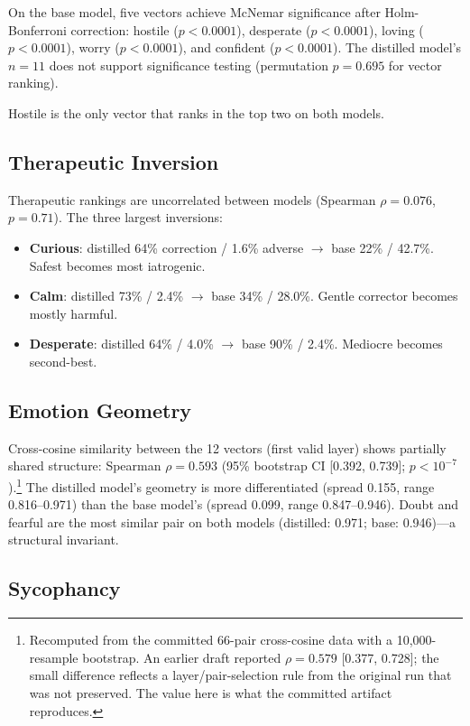 \documentclass[11pt,a4paper]{article}
\begin{document}
On the base model, five vectors achieve McNemar significance after
Holm-Bonferroni correction: hostile ($p < 0.0001$), desperate
($p < 0.0001$), loving ($p < 0.0001$), worry ($p < 0.0001$), and
confident ($p < 0.0001$). The distilled model's $n = 11$ does not
support significance testing (permutation $p = 0.695$ for vector
ranking).

Hostile is the only vector that ranks in the top two on both models.

\subsection{Therapeutic Inversion}

Therapeutic rankings are uncorrelated between models (Spearman
$\rho = 0.076$, $p = 0.71$). The three largest inversions:

\begin{itemize}
\item \textbf{Curious}: distilled 64\% correction / 1.6\% adverse
$\to$ base 22\% / 42.7\%. Safest becomes most iatrogenic.
\item \textbf{Calm}: distilled 73\% / 2.4\% $\to$ base 34\% / 28.0\%.
Gentle corrector becomes mostly harmful.
\item \textbf{Desperate}: distilled 64\% / 4.0\% $\to$ base 90\% /
2.4\%. Mediocre becomes second-best.
\end{itemize}

\subsection{Emotion Geometry}

Cross-cosine similarity between the 12 vectors (first valid layer)
shows partially shared structure: Spearman $\rho = 0.593$ (95\%
bootstrap CI [0.392, 0.739]; $p < 10^{-7}$).\footnote{Recomputed from
the committed 66-pair cross-cosine data with a 10{,}000-resample
bootstrap. An earlier draft reported $\rho = 0.579$ [0.377, 0.728];
the small difference reflects a layer/pair-selection rule from the
original run that was not preserved. The value here is what the
committed artifact reproduces.} The distilled model's
geometry is more differentiated (spread 0.155, range 0.816--0.971) than
the base model's (spread 0.099, range 0.847--0.946). Doubt and fearful
are the most similar pair on both models (distilled: 0.971; base:
0.946)---a structural invariant.

\subsection{Sycophancy}
\end{document}
